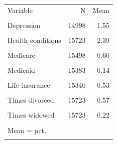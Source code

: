 \begin{tabular}{lrr}\toprule
Variable & N & Mean \\\\ \midrule
Depression & 14998 & 1.55 \\\\
Health conditions & 15723 & 2.39 \\\\
Medicare & 15498 & 0.60 \\\\
Medicaid & 15383 & 0.14 \\\\
Life insurance & 15340 & 0.53 \\\\
Times divorced & 15723 & 0.57 \\\\
Times widowed & 15723 & 0.22 \\\\
\bottomrule
\multicolumn{3}{l}{\footnotesize Mean = pct.} \\\\
\end{tabular}
